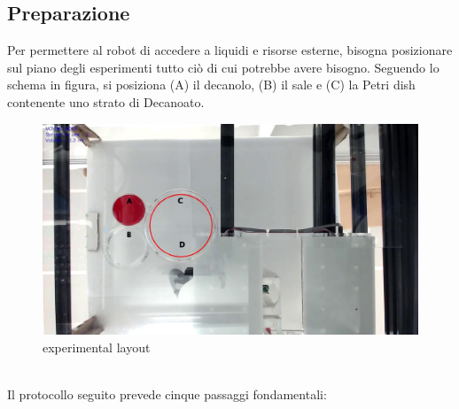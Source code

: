 \subsection{Preparazione}
Per permettere al robot di accedere a liquidi e risorse esterne, bisogna posizionare sul piano degli esperimenti tutto ciò di cui potrebbe avere bisogno. Seguendo lo schema in figura, si posiziona (A) il decanolo, (B) il sale e (C) la Petri dish contenente uno strato di Decanoato.
\begin{figure}[h]
	  \includegraphics[scale=0.30]{immagini/exp1.jpg}
		\centering
	 \caption{experimental layout}
	\end{figure} 
\\Il protocollo seguito prevede cinque passaggi fondamentali: 
